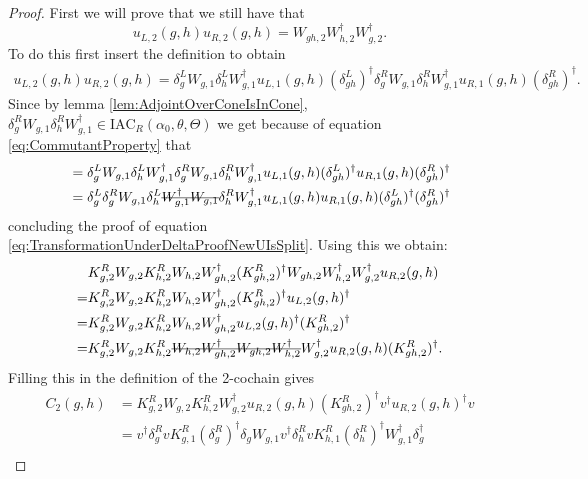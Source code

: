\documentclass[12pt,a4paper,twoside]{article}
\newcommand{\stkout}[1]{\ifmmode\text{\sout{\ensuremath{#1}}}\else\sout{#1}\fi}
\theoremstyle{definition}
\numberwithin{equation}{section}
\begin{document}
\begin{proof}
	First we will prove that we still have that
	\begin{equation}\label{eq:TransformationUnderDeltaProofNewUIsSplit}
		u_{L,2}(g,h)u_{R,2}(g,h)=W_{gh,2}W_{h,2}^\dagger W_{g,2}^\dagger.
	\end{equation}
	To do this first insert the definition to obtain
	\begin{align}
		u_{L,2}(g,h)u_{R,2}(g,h)=\delta_g^L W_{g,1}\delta_h^L W_{g,1}^\dagger u_{L,1}(g,h)(\delta_{gh}^L)^\dagger \delta_g^R W_{g,1}\delta_h^R W_{g,1}^\dagger u_{R,1}(g,h)(\delta_{gh}^R)^\dagger.
	\end{align}
	Since by lemma \ref{lem:AdjointOverConeIsInCone}, $\delta_g^R W_{g,1}\delta_h^R W_{g,1}^\dagger\in\textrm{IAC}_R(\alpha_0,\theta,\Theta)$ we get because of equation \eqref{eq:CommutantProperty} that
	\begin{align}
		&=\delta_g^L W_{g,1}\delta_h^L W_{g,1}^\dagger \delta_g^R W_{g,1}\delta_h^R W_{g,1}^\dagger u_{L,1}(g,h)(\delta_{gh}^L)^\dagger  u_{R,1}(g,h)(\delta_{gh}^R)^\dagger\\
		&=\delta_g^L \delta_g^R W_{g,1}\delta_h^L \stkout{ W_{g,1}^\dagger W_{g,1}}\delta_h^R W_{g,1}^\dagger u_{L,1}(g,h)  u_{R,1}(g,h)(\delta_{gh}^L)^\dagger(\delta_{gh}^R)^\dagger
	\end{align}
	concluding the proof of equation \eqref{eq:TransformationUnderDeltaProofNewUIsSplit}. Using this we obtain:
	\begin{align}
		&K_{g,2}^RW_{g,2}K_{h,2}^{R}W_{h,2}W_{gh,2}^\dagger(K_{gh,2}^R)^\dagger W_{gh,2}W_{h,2}^\dagger W_{g,2}^\dagger u_{R,2}(g,h)\\
		=&K_{g,2}^RW_{g,2}K_{h,2}^{R}W_{h,2}W_{gh,2}^\dagger(K_{gh,2}^R)^\dagger u_{L,2}(g,h)^\dagger\\
		=&K_{g,2}^RW_{g,2}K_{h,2}^{R}W_{h,2}W_{gh,2}^\dagger u_{L,2}(g,h)^\dagger (K_{gh,2}^R)^\dagger\\
		=&K_{g,2}^RW_{g,2}K_{h,2}^{R}\stkout{W_{h,2}W_{gh,2}^\dagger W_{gh,2}W_{h,2}^\dagger} W_{g,2}^\dagger u_{R,2}(g,h) (K_{gh,2}^R)^\dagger.
	\end{align}
	Filling this in the definition of the 2-cochain gives
	\begin{align}
		C_2(g,h)&=K_{g,2}^RW_{g,2}K_{h,2}^{R}W_{g,2}^\dagger u_{R,2}(g,h) (K_{gh,2}^R)^\dagger v^\dagger u_{R,2}(g,h)^\dagger v\\
		&=v^\dagger \delta_g^R v K_{g,1}^R (\delta_g^R)^\dagger \delta_g W_{g,1}v^\dagger \delta_h^R v K_{h,1}^R (\delta_h^R)^\dagger W_{g,1}^\dagger \delta_g^\dagger\\

\end{align}
\end{proof}
\end{document}
